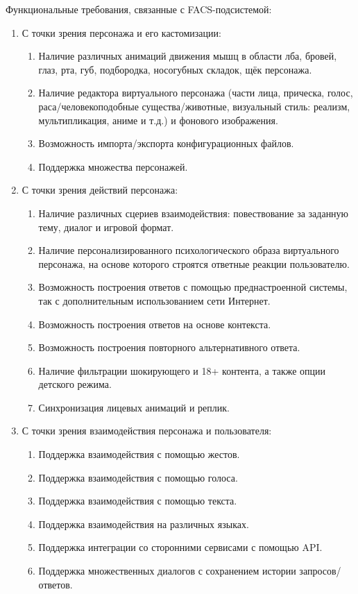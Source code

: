 \documentclass[a4paper,14pt]{extarticle}
\begin{document}
\begin{spacing}{1.5}
Функциональные требования, связанные с FACS-подсистемой:
\begin{enumerate}[label*=\arabic*.]    
    \item С точки зрения персонажа и его кастомизации:
        \begin{enumerate}[label*=\arabic*.]
            \item Наличие различных анимаций движения мышц в области лба, бровей, глаз, рта, губ, подбородка, носогубных складок, щёк персонажа.
            \item Наличие редактора виртуального персонажа (части лица, прическа, голос, раса/человекоподобные существа/животные, визуальный стиль: реализм, мультипликация, аниме и т.д.) и фонового изображения.
            \item Возможность импорта/экспорта конфигурационных файлов.
            \item Поддержка множества персонажей.
        \end{enumerate}
    \item С точки зрения действий персонажа:
        \begin{enumerate}[label*=\arabic*.]
            \item Наличие различных сцериев взаимодействия: повествование за заданную тему, диалог и игровой формат.
            \item Наличие персонализированного психологического образа виртуального персонажа, на основе которого строятся ответные реакции пользователю.
            \item Возможность построения ответов с помощью преднастроенной системы, так с дополнительным использованием сети Интернет.
            \item Возможность построения ответов на основе контекста.
            \item Возможность построения повторного альтернативного ответа.
            \item Наличие фильтрации шокирующего и 18+ контента, а также опции детского режима.
            \item Синхронизация лицевых анимаций и реплик.
        \end{enumerate}
    \item С точки зрения взаимодействия персонажа и пользователя:
        \begin{enumerate}[label*=\arabic*.]
            \item Поддержка взаимодействия с помощью жестов.
            \item Поддержка взаимодействия с помощью голоса.
            \item Поддержка взаимодействия с помощью текста.
            \item Поддержка взаимодействия на различных языках.
            \item Поддержка интеграции со сторонними сервисами с помощью API.
            \item Поддержка множественных диалогов с сохранением истории запросов/ответов.
        \end{enumerate}
\end{enumerate}


\end{spacing}
\end{document}
